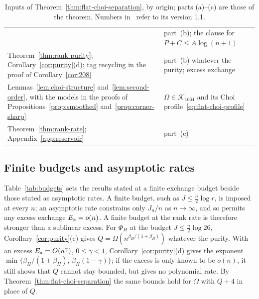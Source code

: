 \documentclass[11pt,a4paper]{article}
\theoremstyle{plain}
\theoremstyle{definition}
\theoremstyle{remark}
\begin{document}
\begin{table}[htbp]
\begin{tabular}{@{}p{}p{}@{}}
& \raggedright part~(b); the clause for $P+C\le A\log(n+1)$\tabularnewline
\raggedright Theorem~\ref{thm:rank-purity}; Corollary~\ref{cor:purity}(d); tag recycling in the proof of Corollary~\ref{cor:208}
& \raggedright part~(b) whatever the purity; excess exchange\tabularnewline
\raggedright Lemmas~\ref{lem:choi-structure} and~\ref{lem:second-order}, with the models in the proofs of
Propositions~\ref{prop:smoothed} and~\ref{prop:corner-sharp}
& \raggedright $\Omega\in\mathcal K_{1664}$ and its Choi profile~\eqref{eq:flat-choi-profile}\tabularnewline
\raggedright Theorem~\ref{thm:rank-rate}; Appendix~\ref{app:reservoir}
& \raggedright part~(c)\tabularnewline
\bottomrule
\end{tabular}
\caption{Inputs of Theorem~\ref{thm:flat-choi-separation}, by origin; parts (a)--(c) are those of the theorem. Numbers
in~\cite{DouglasMghirbiA} refer to its version 1.1.}
\label{tab:dependencies}
\end{table}

\subsection{Finite budgets and asymptotic rates}\label{sec:budgets}

Table~\ref{tab:budgets} sets the results stated at a finite exchange budget beside those stated as asymptotic rates. A finite budget, such as
$J\le\frac n2\log r$, is imposed at every $n$; an asymptotic rate constrains only $J_n/n$ as $n\to\infty$, and so permits any excess exchange
$E_{\rm x}=o(n)$. A finite budget at the rank rate is therefore stronger than a sublinear excess. For $\Phi_H$ at the
budget $J\le\frac n2\log26$, Corollary~\ref{cor:purity}(c) gives $Q=\Omega(n^{\beta_H/(1+\beta_H)})$ whatever the purity. With an excess
$E_{\rm x}=O(n^\gamma)$, $0\le\gamma<1$, Corollary~\ref{cor:purity}(d) gives the exponent $\min\{\beta_H/(1+\beta_H),\,\beta_H(1-\gamma)\}$; if the excess
is only known to be $o(n)$, it still shows that $Q$ cannot stay bounded, but gives no polynomial rate. By Theorem~\ref{thm:flat-choi-separation}
the same bounds hold for $\Omega$ with $Q+4$ in place of $Q$.
\end{document}
